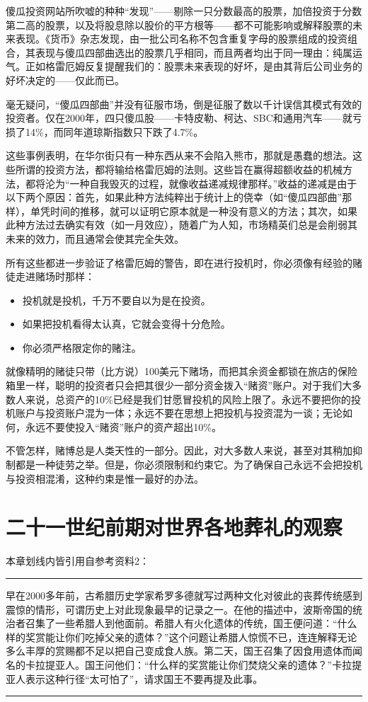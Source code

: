 \documentclass[12pt,oneside]{book}
\newcommand\hr{\par\noindent\hrule}
\begin{document}
\begin{itemize}
傻瓜投资网站所吹嘘的种种“发现”——剔除一只分数最高的股票，加倍投资于分数第二高的股票，以及将股息除以股价的平方根等——都不可能影响或解释股票的未来表现。《货币》杂志发现，由一批公司名称不包含重复字母的股票组成的投资组合，其表现与傻瓜四部曲选出的股票几乎相同，而且两者均出于同一理由：纯属运气。正如格雷厄姆反复提醒我们的：股票未来表现的好坏，是由其背后公司业务的好坏决定的——仅此而已。

毫无疑问，“傻瓜四部曲”并没有征服市场，倒是征服了数以千计误信其模式有效的投资者。仅在2000年，四只傻瓜股——卡特皮勒、柯达、SBC和通用汽车——就亏损了14\%，而同年道琼斯指数只下跌了4.7\%。


\end{itemize}


这些事例表明，在华尔街只有一种东西从来不会陷入熊市，那就是愚蠢的想法。这些所谓的投资方法，都将输给格雷厄姆的法则。这些旨在赢得超额收益的机械方法，都将沦为“一种自我毁灭的过程，就像收益递减规律那样。”收益的递减是由于以下两个原因：首先，如果此种方法纯粹出于统计上的侥幸（如“傻瓜四部曲”那样），单凭时间的推移，就可以证明它原本就是一种没有意义的方法；其次，如果此种方法过去确实有效（如一月效应），随着广为人知，市场精英们总是会削弱其未来的效力，而且通常会使其完全失效。


所有这些都进一步验证了格雷厄姆的警告，即在进行投机时，你必须像有经验的赌徒走进赌场时那样：

\begin{itemize}
\item 投机就是投机，千万不要自以为是在投资。
\item 如果把投机看得太认真，它就会变得十分危险。
\item 你必须严格限定你的赌注。
\end{itemize}


就像精明的赌徒只带（比方说）100美元下赌场，而把其余资金都锁在旅店的保险箱里一样，聪明的投资者只会把其很少一部分资金拨入“赌资”账户。对于我们大多数人来说，总资产的10\%已经是我们甘愿冒投机的风险上限了。永远不要把你的投机账户与投资账户混为一体；永远不要在思想上把投机与投资混为一谈；无论如何，永远不要使投入“赌资”账户的资产超出10\%。

不管怎样，赌博总是人类天性的一部分。因此，对大多数人来说，甚至对其稍加抑制都是一种徒劳之举。但是，你必须限制和约束它。为了确保自己永远不会把投机与投资相混淆，这种约束是惟一最好的办法。



\chapter{二十一世纪前期对世界各地葬礼的观察}
本章划线内皆引用自参考资料2：
\hr
早在2000多年前，古希腊历史学家希罗多德就写过两种文化对彼此的丧葬传统感到震惊的情形，可谓历史上对此现象最早的记录之一。在他的描述中，波斯帝国的统治者召集了一些希腊人到他面前。希腊人有火化遗体的传统，国王便问道：“什么样的奖赏能让你们吃掉父亲的遗体？”这个问题让希腊人惊慌不已，连连解释无论多么丰厚的赏赐都不足以把自己变成食人族。第二天，国王召集了因食用遗体而闻名的卡拉提亚人。国王问他们：“什么样的奖赏能让你们焚烧父亲的遗体？”卡拉提亚人表示这种行径“太可怕了”，请求国王不要再提及此事。
\hr
\end{document}
